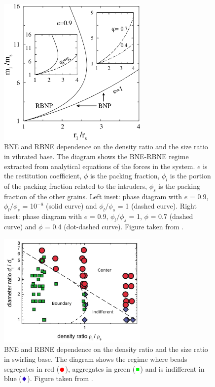 \begin{figure}
    \centering
    \includegraphics[width=0.65\textwidth]{04-figuras/BNE_Trujillo.png}
    \caption[Phase diagram of BNE/RBNE from analytics: density ratio and size ratio.]{BNE and RBNE dependence on the density ratio and the size ratio in vibrated base. The diagram shows the BNE-RBNE regime extracted from analytical equations of the forces in the system. $e$ is the restitution coefficient, $\phi$ is the packing fraction, $\phi_{l}$ is the portion of the packing fraction related to the intruders, $\phi_{s}$ is the packing fraction of the other grains. Left inset: phase diagram with $e$ = 0.9, $\phi_{l} / \phi_{s}$ = 10$^{-8}$ (solid curve) and $\phi_{l} / \phi_{s}$ = 1 (dashed curve). Right inset: phase diagram with $e$ = 0.9, $\phi_{l} / \phi_{s}$ = 1, $\phi$ = 0.7 (dashed curve) and $\phi$ = 0.4 (dot-dashed curve). Figure taken from \cite{Segregation_in_a_fluidized_binary_granular_mixture_Competition_between_buoyancy_and_geometric_forces}.}
    \label{fig:RBNE_trujillo}
\end{figure}

\begin{figure}
    \centering
    \includegraphics[width=0.65\textwidth]{04-figuras/BNE_Schnautz.png}
    \caption[Phase diagram of BNE/RBNE in swirling: density ratio and size ratio.]{BNE and RBNE dependence on the density ratio and the size ratio in swirling base. The diagram shows the regime where beads segregates in red ($\textcolor{red}{\CIRCLE}$), aggregates in green ($\textcolor{green}{\blacksquare}$) and is indifferent in blue ($\textcolor{blue}{\Diamondblack}$). Figure taken from \cite{A_Horizontal_Brazil-Nut_Effect_and_Its_Reverse}.}
    \label{fig:RBNE_schnautz}
\end{figure}

